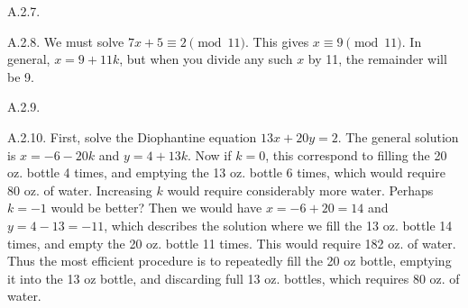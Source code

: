 \begin {itemize}
\begin{ans}{A.2.7.}
	
\end{ans}
\begin{ans}{A.2.8.}
		We must solve $7x + 5 \equiv 2 \pmod{11}$.  This gives $x \equiv 9 \pmod{11}$.  In general, $x = 9 + 11k$, but when you divide any such $x$ by 11, the remainder will be 9.
	
\end{ans}
\begin{ans}{A.2.9.}
  	
\end{ans}
\begin{ans}{A.2.10.}
		First, solve the Diophantine equation $13x + 20 y = 2$.  The general solution is $x = -6 - 20k$ and $y = 4+13k$.  Now if $k = 0$, this correspond to filling the 20 oz. bottle 4 times, and emptying the 13 oz. bottle 6 times, which would require 80 oz. of water.  Increasing $k$ would require considerably more water.  Perhaps $k = -1$ would be better?  Then we would have $x = -6+20 = 14$ and $y = 4-13 = -11$, which describes the solution where we fill the 13 oz. bottle 14 times, and empty the 20 oz. bottle 11 times.  This would require 182 oz. of water.  Thus the most efficient procedure is to repeatedly fill the 20 oz bottle, emptying it into the 13 oz bottle, and discarding full 13 oz. bottles, which requires 80 oz. of water.
	
\end{ans}
\protect \end {itemize}

